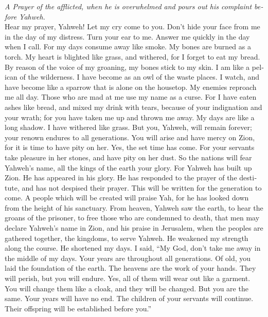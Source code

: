 \begin{paracol}{2}
\begin{otherlanguage}{english}
\emph{A Prayer of the afflicted, when he is overwhelmed and pours out
his complaint before Yahweh.}\\
 Hear my prayer, Yahweh! Let my cry come to you.
 Don't hide your face from me in the day of my distress.
Turn your ear to me. Answer me quickly in the day when I call.
 For my days consume away like smoke. My bones are burned
as a torch.  My heart is blighted like grass, and
withered, for I forget to eat my bread.  By reason of the
voice of my groaning, my bones stick to my skin.  I am
like a pelican of the wilderness. I have become as an owl of the waste
places.  I watch, and have become like a sparrow that is
alone on the housetop.  My enemies reproach me all day.
Those who are mad at me use my name as a curse.  For I
have eaten ashes like bread, and mixed my drink with tears,
 because of your indignation and your wrath; for you have
taken me up and thrown me away.  My days are like a long
shadow. I have withered like grass.  But you, Yahweh,
will remain forever; your renown endures to all generations.
 You will arise and have mercy on Zion, for it is time to
have pity on her. Yes, the set time has come.  For your
servants take pleasure in her stones, and have pity on her dust.
 So the nations will fear Yahweh's name, all the kings of
the earth your glory.  For Yahweh has built up Zion. He
has appeared in his glory.  He has responded to the
prayer of the destitute, and has not despised their prayer.
 This will be written for the generation to come. A
people which will be created will praise Yah,  for he has
looked down from the height of his sanctuary. From heaven, Yahweh saw
the earth,  to hear the groans of the prisoner, to free
those who are condemned to death,  that men may declare
Yahweh's name in Zion, and his praise in Jerusalem,  when
the peoples are gathered together, the kingdoms, to serve Yahweh.
 He weakened my strength along the course. He shortened
my days.  I said, ``My God, don't take me away in the
middle of my days. Your years are throughout all generations.
 Of old, you laid the foundation of the earth. The
heavens are the work of your hands.  They will perish,
but you will endure. Yes, all of them will wear out like a garment. You
will change them like a cloak, and they will be changed. 
But you are the same. Your years will have no end.  The
children of your servants will continue. Their offspring will be
established before you.''


\end{otherlanguage}
\end{paracol}
